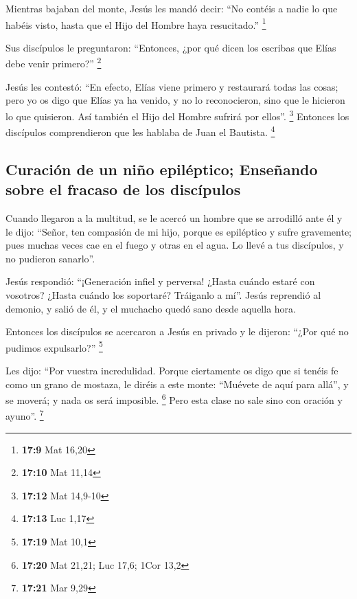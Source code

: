 \begin{paracol}{2}
 Mientras bajaban del monte, Jesús les mandó decir: ``No
contéis a nadie lo que habéis visto, hasta que el Hijo del Hombre haya
resucitado.'' \footnote{\textbf{17:9} Mat 16,20}

 Sus discípulos le preguntaron: ``Entonces, ¿por qué
dicen los escribas que Elías debe venir primero?'' \footnote{\textbf{17:10}
  Mat 11,14}

 Jesús les contestó: ``En efecto, Elías viene primero y
restaurará todas las cosas;  pero yo os digo que Elías ya
ha venido, y no lo reconocieron, sino que le hicieron lo que quisieron.
Así también el Hijo del Hombre sufrirá por ellos''. \footnote{\textbf{17:12}
  Mat 14,9-10}  Entonces los discípulos comprendieron que
les hablaba de Juan el Bautista. \footnote{\textbf{17:13} Luc 1,17}

\hypertarget{curaciuxf3n-de-un-niuxf1o-epiluxe9ptico-enseuxf1ando-sobre-el-fracaso-de-los-discuxedpulos}{%
\subsection{Curación de un niño epiléptico; Enseñando sobre el fracaso
de los
discípulos}\label{curaciuxf3n-de-un-niuxf1o-epiluxe9ptico-enseuxf1ando-sobre-el-fracaso-de-los-discuxedpulos}}

 Cuando llegaron a la multitud, se le acercó un hombre
que se arrodilló ante él y le dijo:  ``Señor, ten
compasión de mi hijo, porque es epiléptico y sufre gravemente; pues
muchas veces cae en el fuego y otras en el agua.  Lo
llevé a tus discípulos, y no pudieron sanarlo''.

 Jesús respondió: ``¡Generación infiel y perversa! ¿Hasta
cuándo estaré con vosotros? ¿Hasta cuándo los soportaré? Tráiganlo a
mí''.  Jesús reprendió al demonio, y salió de él, y el
muchacho quedó sano desde aquella hora.

 Entonces los discípulos se acercaron a Jesús en privado
y le dijeron: ``¿Por qué no pudimos expulsarlo?'' \footnote{\textbf{17:19}
  Mat 10,1}

 Les dijo: ``Por vuestra incredulidad. Porque ciertamente
os digo que si tenéis fe como un grano de mostaza, le diréis a este
monte: ``Muévete de aquí para allá'', y se moverá; y nada os será
imposible. \footnote{\textbf{17:20} Mat 21,21; Luc 17,6; 1Cor 13,2}
 Pero esta clase no sale sino con oración y ayuno''.
\footnote{\textbf{17:21} Mar 9,29}


\end{paracol}
